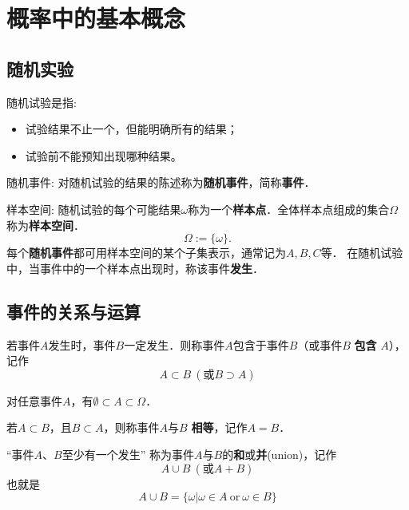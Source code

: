 
\usepackage{ctex}



% 

\section{概率中的基本概念}

\subsection{随机实验}

\begin{definition}
    随机试验是指: 
    \begin{itemize}
        \item 试验结果不止一个，但能明确所有的结果；
        \item 试验前不能预知出现哪种结果。
    \end{itemize}
\end{definition}

\begin{definition}
    随机事件: 对随机试验的结果的陈述称为\textbf{随机事件}，简称\textbf{事件}．
\end{definition}

\begin{definition}
    样本空间: 随机试验的每个可能结果$\omega$称为一个\textbf{样本点}．全体样本点组成的集合$\Omega$称为\textbf{样本空间}．
    $$
        \Omega:=\{\omega\}.
    $$
    每个\textbf{随机事件}都可用样本空间的某个子集表示，通常记为$A, B, C$等．
    在随机试验中，当事件中的一个样本点出现时，称该事件\textbf{发生}．
\end{definition}

\subsection{事件的关系与运算}

\begin{definition}[事件的关系] 
    若事件$A$发生时，事件$B$一定发生．则称事件$A$包含于事件$B$（或事件$B$ \textbf{包含} $A$），记作
    $$A\subset B \ (\text{或}B\supset A)$$

    对任意事件$A$，有$\emptyset \subset A\subset \Omega$．

    若$A\subset B$，且$B\subset A$，则称事件$A$与$B$ \textbf{相等}，记作$A=B$．
    
\end{definition}

\begin{definition}[事件的运算]
    
        “事件$A$、$B$至少有一个发生”
    称为事件$A$与$B$的\textbf{和}或\textbf{并}(union)，记作
    $$A\cup B \ (\text{或}A+B)$$
    也就是
    $$A\cup B=\{\omega | \omega\in A \ \text{or}\ \omega\in B\}$$
\end{definition}


